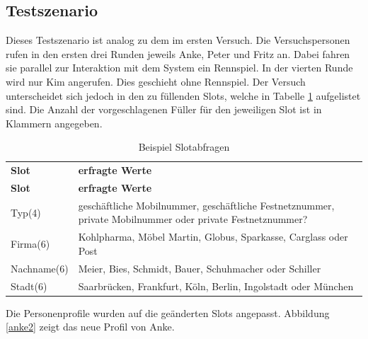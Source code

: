 \documentclass[12pt,a4paper]{scrartcl}
\begin{document}
\subsection{Testszenario}
Dieses Testszenario ist analog zu dem im ersten Versuch. Die Versuchspersonen rufen in den ersten drei Runden jeweils Anke, Peter und Fritz an. Dabei fahren sie parallel zur Interaktion mit dem System ein Rennspiel. In der vierten Runde wird nur Kim angerufen. Dies geschieht ohne Rennspiel. Der Versuch unterscheidet sich jedoch in den zu füllenden Slots, welche in Tabelle \ref{slots2} aufgelistet sind. Die Anzahl der vorgeschlagenen Füller für den jeweiligen Slot ist in Klammern angegeben.
\newpage


\begin{longtable}{p{4cm}p{10cm}}
	\label{slots2}\\
	\caption[Slotabfragen]{Beispiel Slotabfragen}\\
	\hline
	\textbf{Slot} &\textbf{erfragte Werte}\\
	\hline
	\endfirsthead
	\hline
	\textbf{Slot} &	\textbf{erfragte Werte}\\
	\hline
	\endhead
Typ(4) & geschäftliche Mobilnummer, geschäftliche Festnetznummer, private Mobilnummer oder private Festnetznummer?\\
Firma(6) & Kohlpharma, Möbel Martin, Globus, Sparkasse, Carglass oder Post\\
Nachname(6) & Meier, Bies, Schmidt, Bauer, Schuhmacher oder Schiller \\
Stadt(6) & Saarbrücken, Frankfurt, Köln, Berlin, Ingolstadt oder München\\
\hline
\end{longtable}
\newpage

Die Personenprofile wurden auf die geänderten Slots angepasst. Abbildung \ref{anke2} zeigt das neue Profil von Anke. 
\end{document}
